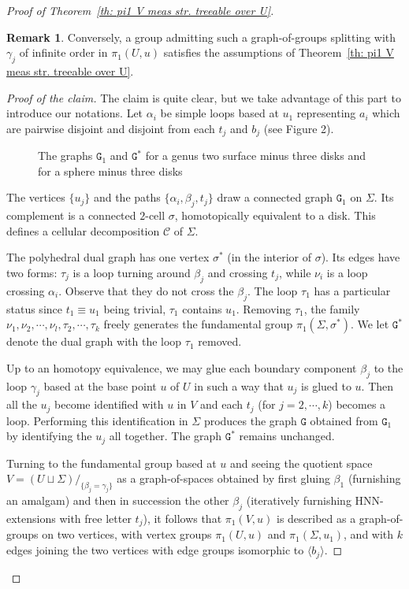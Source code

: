 \documentclass[11pt]{amsart}
\theoremstyle{definition}
\newtheorem{remark}[definition]{Remark}
\theoremstyle{plain}
\newcommand{\<}{\langle}
\renewcommand{\>}{\rangle}
\newcommand{\disjointunion}{\sqcup}
\newcommand\GGG{\mathtt{G}}
\newcommand\CC{\mathcal{C}}
\begin{document}
\begin{proof}[Proof of Theorem~\ref{th: pi1 V meas str. treeable over U}]
\begin{remark}
Conversely, a group admitting such a graph-of-groups splitting  with $\gamma_j$ of infinite order in $\pi_1(U,u)$ satisfies the assumptions of Theorem~\ref{th: pi1 V meas str. treeable over U}.
\end{remark}
%
\begin{proof}[Proof of the claim] The claim is quite clear, but we
take advantage of this part to introduce our notations.
Let $\alpha_i$ be simple loops based at $u_1$ representing $a_i$ which are pairwise disjoint and disjoint from each $t_j$ and $b_j$
 (see Figure 2).
\begin{center}
\begin{figure}[h!]
\resizebox{75mm}{!}{} \hskip 2mm
\resizebox{60mm}{!}{}
\label{pict: hyperbolic-octogon-3-holes}
\caption{The graphs $\GGG_1$ and $\GGG^*$ for a genus two surface minus three disks and for a sphere minus three disks}
\end{figure}
\end{center}
%
The vertices $\{u_j\}$ and the paths $\{\alpha_i, \beta_j, t_j\}$ draw a connected graph $\GGG_1$ on $\Sigma$.
Its complement is a connected $2$-cell $\sigma$, homotopically equivalent to a disk. This defines a cellular decomposition $\CC$ of $\Sigma$.

The polyhedral dual graph has one vertex $\sigma^*$ (in the interior of $\sigma$).  Its edges have two forms: $\tau_j$ is a loop turning around $\beta_j$ and crossing $t_j$, while $\nu_i$  is a loop crossing $\alpha_i$. Observe that they do not cross the $\beta_j$. The loop $\tau_1$ has a particular status since $t_1\equiv u_1$ being trivial, $\tau_1$ contains $u_1$. Removing $\tau_1$, the family
$\nu_1, \nu_2, \cdots, \nu_{l}, \tau_2, \cdots, \tau_k$
 freely  generates the fundamental group $\pi_1(\Sigma, \sigma^*)$.
 We let $\GGG^*$ denote the dual graph with the loop $\tau_1$ removed.

Up to an homotopy equivalence, we may glue each boundary component $\beta_j$ to the loop $\gamma_j$ based at the base point $u$ of $U$ in such a way that $u_j$ is glued to $u$. Then all the $u_j$ become identified with $u$ in $V$ and each $t_j$ (for  $j=2, \cdots, k$) becomes a loop.
 Performing this identification in $\Sigma$ produces the graph $\GGG$ obtained  from $\GGG_1$ by identifying the $u_j$ all together.
 The graph $\GGG^*$ remains unchanged.

Turning to the fundamental group based at $u$ and seeing the quotient space $V=(U\disjointunion\Sigma)/_{\{\beta_j=\gamma_j\}} $ as a graph-of-spaces obtained by first gluing $\beta_1$ (furnishing an amalgam) and then in succession the other $\beta_j$ (iteratively furnishing HNN-extensions with free letter $t_j$), it follows that $\pi_1(V,u)$ is described as a graph-of-groups on two vertices, with vertex groups $\pi_1(U,u)$ and $\pi_1(\Sigma, u_1)$, and with $k$ edges joining the two vertices with edge groups isomorphic to $\langle b_j\rangle$.


\end{proof}
\end{proof}
\end{document}
